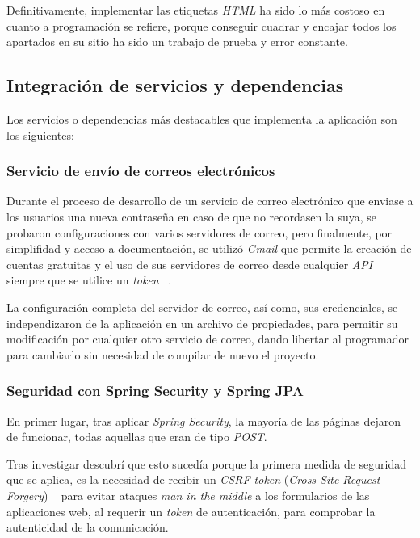Definitivamente, implementar las etiquetas \textit{HTML} ha sido lo más costoso en cuanto a programación se refiere, porque conseguir cuadrar y encajar todos los apartados en su sitio ha sido un trabajo de prueba y error constante.

\subsection{Integración de servicios y dependencias}

Los servicios o dependencias más destacables que implementa la aplicación son los siguientes:

\subsubsection{Servicio de envío de correos electrónicos}

Durante el proceso de desarrollo de un servicio de correo electrónico que enviase a los usuarios una nueva contraseña en caso de que no recordasen la suya, se probaron configuraciones con varios servidores de correo, pero finalmente, por simplifidad y acceso a documentación, se utilizó \textit{Gmail} que permite la creación de cuentas gratuitas y el uso de sus servidores de correo desde cualquier \textit{API} siempre que se utilice un \textit{token} ~\cite{gmail:token}.

La configuración completa del servidor de correo, así como, sus credenciales, se independizaron de la aplicación en un archivo de propiedades, para permitir su modificación por cualquier otro servicio de correo, dando libertar al programador para cambiarlo sin necesidad de compilar de nuevo el proyecto.

\subsubsection{Seguridad con Spring Security y Spring JPA}

En primer lugar, tras aplicar \textit{Spring Security}, la mayoría de las páginas dejaron de funcionar, todas aquellas que eran de tipo \textit{POST}.

Tras investigar descubrí que esto sucedía porque la primera medida de seguridad que se aplica, es la necesidad de recibir un \textit{CSRF token} (\textit{Cross-Site Request Forgery}) ~\cite{web:csrf} para evitar ataques \textit{man in the middle} a los formularios de las aplicaciones web, al requerir un \textit{token} de autenticación, para comprobar la autenticidad de la comunicación.


